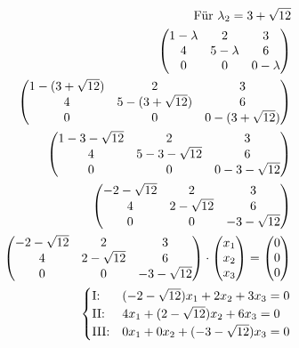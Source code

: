 \begin{align*}
    \text{Für } \lambda_2 = 3 + \sqrt{12} \\
    \begin{pmatrix}
        1 - \lambda & 2 & 3 \\
        4 & 5 - \lambda & 6 \\
        0 & 0 & 0 - \lambda
    \end{pmatrix} \\
    \begin{pmatrix}
        1 - (3 + \sqrt{12}) & 2 & 3 \\
        4 & 5 - (3 + \sqrt{12}) & 6 \\
        0 & 0 & 0 - (3 + \sqrt{12})
    \end{pmatrix} \\
    \begin{pmatrix}
        1 - 3 - \sqrt{12} & 2 & 3 \\
        4 & 5 - 3 - \sqrt{12} & 6 \\
        0 & 0 & 0 - 3 - \sqrt{12}
    \end{pmatrix} \\
    \begin{pmatrix}
        -2 - \sqrt{12} & 2 & 3 \\
        4 & 2 - \sqrt{12} & 6 \\
        0 & 0 & -3 - \sqrt{12}
    \end{pmatrix} \\
    \begin{pmatrix}
        -2 - \sqrt{12} & 2 & 3 \\
        4 & 2 - \sqrt{12} & 6 \\
        0 & 0 & -3 - \sqrt{12}
    \end{pmatrix} \cdot \begin{pmatrix}
        x_1 \\ x_2 \\ x_3
    \end{pmatrix} = \begin{pmatrix}
        0 \\ 0 \\ 0
    \end{pmatrix} \\
    \begin{cases}
        \text{I:\@} & (-2 - \sqrt{12})x_1 + 2x_2 + 3x_3 = 0 \\
        \text{II:\@} & 4x_1 + (2 - \sqrt{12})x_2 + 6x_3 = 0 \\
        \text{III:\@} & 0x_1 + 0x_2 + (-3 - \sqrt{12})x_3 = 0
    \end{cases}
\end{align*}

